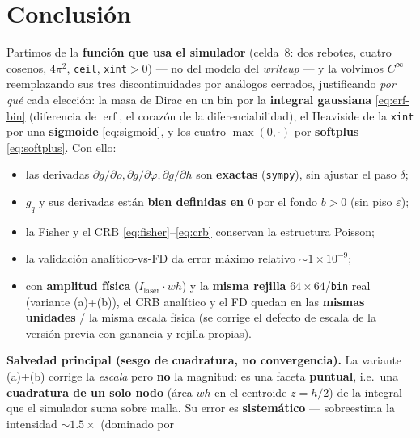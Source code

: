 \documentclass[11pt,a4paper]{article}
\theoremstyle{plain}
\theoremstyle{definition}
\newcommand{\erf}{\operatorname{erf}}
\begin{document}
\section{Conclusi\'on}
\label{sec:conclusion}

Partimos de la \textbf{funci\'on que usa el simulador} (celda~8: dos rebotes,
cuatro cosenos, $4\pi^2$, \texttt{ceil}, \texttt{xint}$>0$) --- no del modelo del
\emph{writeup} --- y la volvimos $C^\infty$ reemplazando sus tres
discontinuidades por an\'alogos cerrados, justificando \emph{por qu\'e} cada
elecci\'on: la masa de Dirac en un bin por la \textbf{integral gaussiana}
\eqref{eq:erf-bin} (diferencia de $\erf$, el coraz\'on de la
diferenciabilidad), el Heaviside de la \texttt{xint} por una \textbf{sigmoide}
\eqref{eq:sigmoid}, y los cuatro $\max(0,\cdot)$ por \textbf{softplus}
\eqref{eq:softplus}. Con ello:
\begin{itemize}[nosep]
    \item las derivadas $\partial g/\partial\rho,\partial g/\partial\varphi,
          \partial g/\partial h$ son \textbf{exactas} (\texttt{sympy}), sin
          ajustar el paso $\delta$;
    \item $g_q$ y sus derivadas est\'an \textbf{bien definidas en $0$} por el
          fondo $b>0$ (sin piso $\varepsilon$);
    \item la Fisher y el CRB \eqref{eq:fisher}--\eqref{eq:crb} conservan la
          estructura Poisson;
    \item la validaci\'on anal\'itico-vs-FD da error m\'aximo relativo
          $\sim1\times10^{-9}$;
    \item con \textbf{amplitud f\'isica} ($I_{\mathrm{laser}}\!\cdot\!w h$) y la
          \textbf{misma rejilla} $64\times64$/\texttt{bin} real (variante
          (a)+(b)), el CRB anal\'itico y el FD quedan en las \textbf{mismas
          unidades} / la misma escala f\'isica (se corrige el defecto de escala de
          la versi\'on previa con ganancia y rejilla propias).
\end{itemize}
\textbf{Salvedad principal (sesgo de cuadratura, no convergencia).} La variante
(a)+(b) corrige la \emph{escala} pero \textbf{no} la magnitud: es una faceta
\textbf{puntual}, i.e.\ una \textbf{cuadratura de un solo nodo} (\'area $w h$ en el
centroide $z=h/2$) de la integral que el simulador suma sobre malla. Su error es
\textbf{sistem\'atico} --- sobreestima la intensidad $\sim1.5\times$ (dominado por
\end{document}
